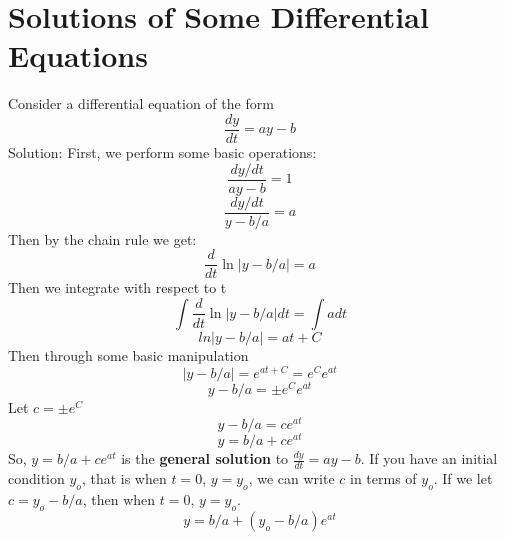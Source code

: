 \section{Solutions of Some Differential Equations}
    Consider a differential equation of the form
    \begin{equation*}
        \frac{dy}{dt} = ay - b
    \end{equation*}
    Solution:
    \newline
    First, we perform some basic operations:
    \begin{equation*}
        \frac{dy / dt}{ay - b} = 1
    \end{equation*}
    \begin{equation*}
        \frac{dy / dt}{y - b / a} = a
    \end{equation*}
    Then by the chain rule we get:
    \begin{equation*}
        \frac{d}{dt} \ln |y - b / a| = a
    \end{equation*}
    Then we integrate with respect to t
    \begin{equation*}
        \int \frac{d}{dt} \ln |y - b / a| dt = \int a dt
    \end{equation*}
    \begin{equation*}
        ln |y - b / a| = at + C
    \end{equation*}
    Then through some basic manipulation
    \begin{equation*}
        |y - b / a| = e^{at + C} = e^Ce^{at}
    \end{equation*}
    \begin{equation*}
        y - b / a = \pm e^Ce^{at}
    \end{equation*}
    Let $c = \pm e^C$
    \begin{equation*}
        y - b / a = ce^{at}
    \end{equation*}
    \begin{equation*}
        y = b / a + ce^{at}
    \end{equation*}
    So, $y = b / a + ce^{at}$ is the \textbf{general solution} to $\frac{dy}{dt} = ay - b$. If you have an initial condition $y_o$, that is when $t = 0$, $y = y_o$, we can write $c$ in terms of $y_o$. If we let $c = y_o - b / a$, then when $t = 0$, $y = y_o$.
    \begin{equation*}
        y = b / a + (y_o - b / a)e^{at}
    \end{equation*}